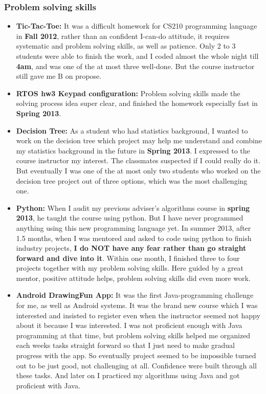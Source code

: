 \documentclass[9pt,b5paper]{article}
\begin{document}
\subsubsection{Problem solving skills}
\label{sec-8-1-1}
\begin{itemize}
\item \textbf{Tic-Tac-Toe:} It was a difficult homework for CS210 programming language in \textbf{Fall 2012}, rather than an confident I-can-do attitude, it requires systematic and problem solving skills, as well as patience. Only 2 to 3 students were able to finish the work, and I coded almost the whole night till \textbf{4am}, and was one of the at most three well-done. But the course instructor still gave me B on propose.
\item \textbf{RTOS hw3 Keypad configuration:} Problem solving skills made the solving process idea super clear, and finished the homework especially fast in \textbf{Spring 2013}.
\item \textbf{Decision Tree:} As a student who had statistics background, I wanted to work on the decision tree which project may help me understand and combine my statistics background in the future in \textbf{Spring 2013}. I expressed to the course instructor my interest. The classmates suspected if I could really do it. But eventually I was one of the at most only two students who worked on the decision tree project out of three options, which was the most challenging one.
\item \textbf{Python:} When I audit my previous adviser's algorithms course in \textbf{spring 2013}, he taught the course using python. But I have never programmed anything using this new programming language yet. In summer 2013, after 1.5 months, when I was mentored and asked to code using python to finish industry projects, \textbf{I do NOT have any fear rather than go straight forward and dive into it}. Within one month, I finished three to four projects together with my problem solving skills. Here guided by a great mentor, positive attitude helps, problem solving skills did even more work.
\item \textbf{Android DrawingFun App:} It was the first Java-programming challenge for me, as well as Android systems. It was the brand new course which I was interested and insisted to register even when the instructor seemed not happy about it because I was interested. I was not proficient enough with Java programming at that time, but problem solving skills helped me organized each weeks tasks straight forward so that I just need to make gradual progress with the app. So eventually project seemed to be impossible turned out to be just good, not challenging at all. Confidence were built through all these tasks. And later on I practiced my algorithms using Java and got proficient with Java.
\end{itemize}
\end{document}
